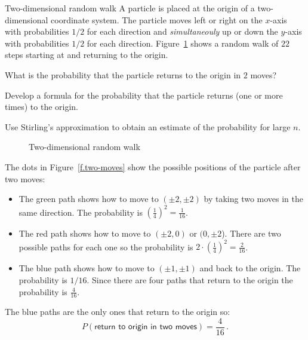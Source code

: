 \begin{prob}{Two-dimensional random walk}
A particle is placed at the origin of a two-dimensional coordinate system. The particle moves left or right on the $x$-axis with probabilities $1/2$ for each direction and \emph{simultaneouly} up or down the $y$-axis with probabilities $1/2$ for each direction. Figure~\ref{f.2d-random-walk} shows a random walk of $22$ steps starting at and returning to the origin.

 What is the probability that the particle returns to the origin in $2$ moves?

 Develop a formula for the probability that the particle returns (one or more times) to the origin.

 Use Stirling's approximation to obtain an estimate of the probability for large $n$.

\begin{figure}[t]
\begin{center}
\end{center}
\caption{Two-dimensional random walk}\label{f.2d-random-walk}
\end{figure}
\end{prob}

\solution{}

The dots in Figure~\ref{f.two-moves} show the possible positions of the particle after two moves:
\begin{itemize}
\item The green path shows how to move to $(\pm 2, \pm 2)$ by taking two moves in the same direction. The probability is $\left(\frac{1}{4}\right)^2= \frac{1}{16}$.
\item The red path shows how to move to $(\pm 2,0)$ or $(0,\pm 2$). There are two possible paths for each one so the probability is $2\cdot\left(\frac{1}{4}\right)^2= \frac{2}{16}$.
\item The blue path shows how to move to $(\pm 1,\pm 1)$ and back to the origin. The probability is $1/16$. Since there are four paths that return to the origin the probability is $\frac{4}{16}$.
\end{itemize}
The blue paths are the only ones that return to the origin so:
\[
P(\textsf{return to origin in two moves})=\frac{4}{16}\,.
\]

